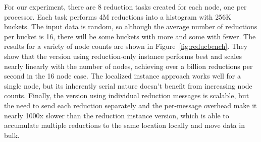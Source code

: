 For our experiment, there are 8 reduction tasks created for each node, one per processor.  Each task performs 4M reductions
into a histogram with 256K buckets.  The input data is random, so although the average number of reductions per bucket is 16, there will be some buckets with more and some with fewer.  The results for a variety of node counts are shown in Figure~\ref{fig:reducbench}.
They show that the version using reduction-only instance performs 
best and scales nearly linearly with the number of nodes, achieving over a billion reductions
per second in the 16 node case.  The localized instance approach works well for a single node, 
but its inherently serial nature doesn't benefit from increasing node counts.  Finally, the version using individual
reduction messages is scalable, but the need to send each reduction separately and the per-message overhead make it nearly 
1000x slower than the reduction instance version, which is
able to accumulate multiple reductions to the same location locally and move data in bulk.


